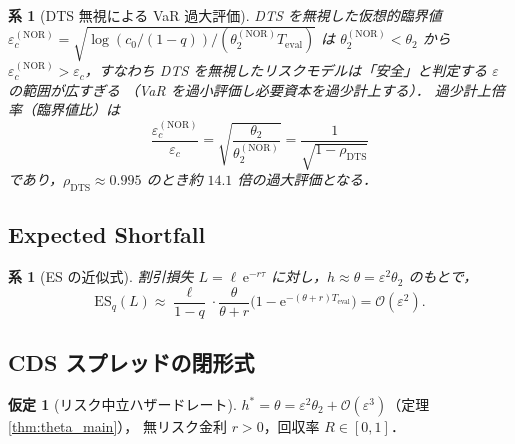 \documentclass[12pt,a4paper]{article}
\theoremstyle{plain}
\newtheorem{corollary}[theorem]{系}
\theoremstyle{definition}
\newtheorem{assumption}[theorem]{仮定}
\theoremstyle{remark}
\newcommand{\calO}{\mathcal{O}}
\newcommand{\eps}{\varepsilon}
\newcommand{\e}{\mathrm{e}}
\newcommand{\ES}{\mathrm{ES}}
\newcommand{\rhoDTS}{\rho_{\mathrm{DTS}}}
\newcommand{\Teval}{T_{\mathrm{eval}}}
\begin{document}
\begin{corollary}[DTS 無視による VaR 過大評価]\label{cor:VaR_DTS}
  DTS を無視した仮想的臨界値
  $\eps_c^{(\mathrm{NOR})} = \sqrt{\log(c_0/(1-q))/(\theta_2^{(\mathrm{NOR})}\Teval)}$
  は $\theta_2^{(\mathrm{NOR})}<\theta_2$ から
  $\eps_c^{(\mathrm{NOR})}>\eps_c$，すなわち
  DTS を無視したリスクモデルは「安全」と判定する $\eps$ の範囲が広すぎる
  （VaR を過小評価し必要資本を過少計上する）．
  過少計上倍率（臨界値比）は
  \begin{equation}
    \frac{\eps_c^{(\mathrm{NOR})}}{\eps_c}
    = \sqrt{\frac{\theta_2}{\theta_2^{(\mathrm{NOR})}}}
    = \frac{1}{\sqrt{1-\rhoDTS}}
  \end{equation}
  であり，$\rhoDTS\approx0.995$ のとき約 $14.1$ 倍の過大評価となる．
\end{corollary}

\subsection{Expected Shortfall}

\begin{corollary}[ES の近似式]\label{cor:ES}
  割引損失 $L=\ell\,\e^{-r\tau}$ に対し，$h\approx\theta=\eps^2\theta_2$ のもとで，
  \begin{equation}
    \ES_q(L)
    \approx \frac{\ell}{1-q}\cdot
    \frac{\theta}{\theta+r}\bigl(1-\e^{-(\theta+r)\Teval}\bigr)
    = \calO(\eps^2).
  \end{equation}
\end{corollary}

\subsection{CDS スプレッドの閉形式}

\begin{assumption}[リスク中立ハザードレート]\label{ass:RN}
  $h^* = \theta = \eps^2\theta_2 + \calO(\eps^3)$（定理 \ref{thm:theta_main}），
  無リスク金利 $r>0$，回収率 $R\in[0,1]$．
\end{assumption}
\end{document}
